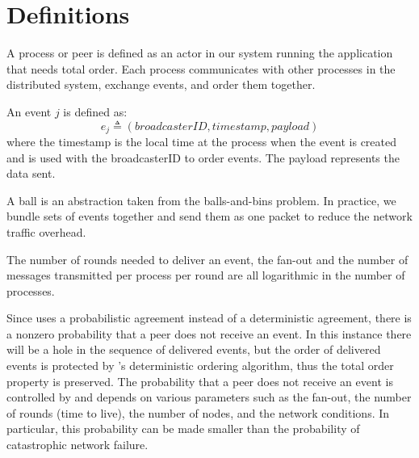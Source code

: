 \section{Definitions}
\label{sec:definitions}
A process or peer is defined as an actor in our system running the application that needs total order. Each process communicates with other processes in the distributed system, exchange events, and order them together.
\par
An event $j$ is defined as: $$e_j \triangleq (broadcasterID,timestamp,payload)$$ where the timestamp is the local time at the process when the event is created and is used with the broadcasterID to order events. The payload represents the data sent.
\par
A ball is an abstraction taken from the balls-and-bins problem. In practice, we bundle sets of events together and send them as one packet to reduce the network traffic overhead.

The number of rounds needed to deliver an event, the fan-out and the number of messages transmitted per process per round are all logarithmic in the number of processes. \autocite{matos2015epto}
\par
Since \epto uses a probabilistic agreement instead of a deterministic agreement, there is a nonzero probability that a peer does not receive an event. In this instance there will be a hole in the sequence of delivered events, but the order of delivered events is protected by \epto's deterministic ordering algorithm, thus the total order property is preserved. The probability that a peer does not receive an event is controlled by \epto and depends on various parameters such as the fan-out, the number of rounds (time to live), the number of nodes, and the network conditions. In particular, this probability can be made smaller than the probability of catastrophic network failure. %
